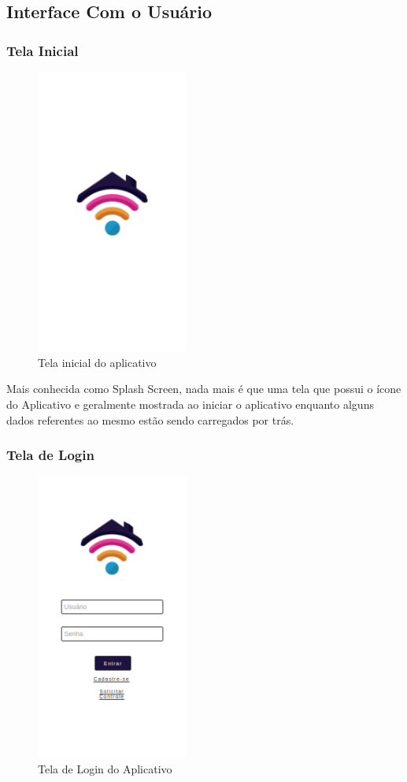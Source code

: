 \subsection{Interface Com o Usuário}

\subsubsection{Tela Inicial}

\begin{figure}[!h]
\centering
\caption{Tela inicial do aplicativo}
\includegraphics[width=5cm]{figuras/splash_screen}
\end{figure}

\par Mais conhecida como Splash Screen, nada mais é que uma tela que possui o ícone do Aplicativo e geralmente mostrada ao iniciar o aplicativo enquanto alguns dados referentes ao mesmo estão sendo carregados por trás.

\subsubsection{Tela de Login}

\begin{figure}[!h]
\centering
\caption{Tela de Login do Aplicativo}
\includegraphics[width=5cm]{figuras/login}
\end{figure}

